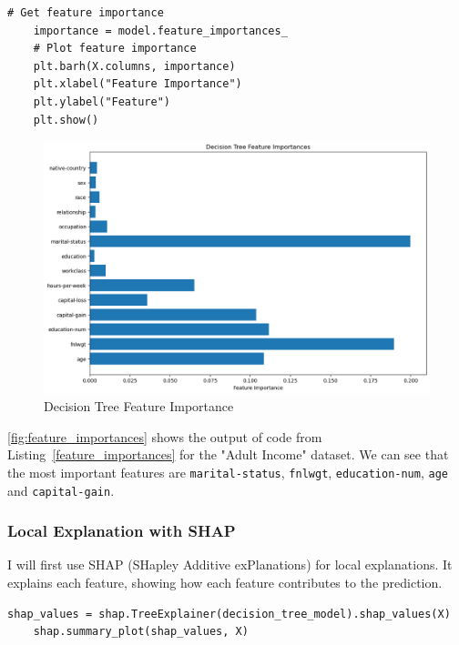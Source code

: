 \documentclass[10pt,journal,compsoc]{IEEEtran}
\begin{document}
\begin{lstlisting}[caption=Feature Importance, label=feature_importances]
    # Get feature importance
    importance = model.feature_importances_
    # Plot feature importance
    plt.barh(X.columns, importance)
    plt.xlabel("Feature Importance")
    plt.ylabel("Feature")
    plt.show()    
\end{lstlisting}

\begin{figure}[H]
    \centering
    \includegraphics[width=1\linewidth]{images/feature_importance_global.png}    
    \caption{Decision Tree Feature Importance}
    \label{fig:feature_importances}
\end{figure}

\autoref{fig:feature_importances} shows the output of code from Listing~\ref{feature_importances} for the "Adult Income" dataset. We can see that the most important features are \texttt{marital-status}, \texttt{fnlwgt}, \texttt{education-num}, \texttt{age} and \texttt{capital-gain}.


\subsubsection{Local Explanation with SHAP}
I will first use SHAP (SHapley Additive exPlanations) for local explanations. It explains each feature, showing how each feature contributes to the prediction. 

\begin{lstlisting}[caption=SHAP Explainer , label=shap_explainer]
    shap_values = shap.TreeExplainer(decision_tree_model).shap_values(X)
    shap.summary_plot(shap_values, X)
\end{lstlisting}
\end{document}
